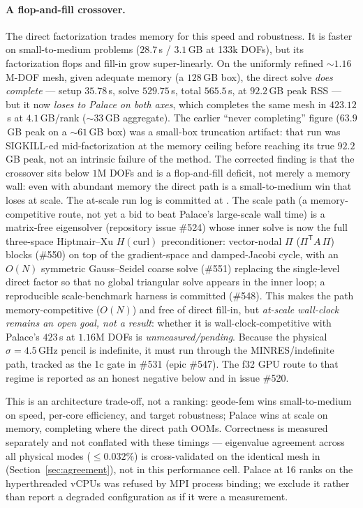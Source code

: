 \documentclass{anvil-paper}
\begin{document}
\paragraph{A flop-and-fill crossover.} The direct factorization trades
memory for this speed and robustness. It is faster on small-to-medium
problems ($28.7$\,s / $3.1$\,GB at 133k DOFs), but its factorization
flops and fill-in grow super-linearly. On the uniformly refined
${\sim}1.16$M-DOF mesh, given adequate memory (a $128$\,GB box), the
direct solve \emph{does complete} --- setup $35.78$\,s, solve
$529.75$\,s, total $565.5$\,s, at $92.2$\,GB peak RSS --- but it now
\emph{loses to Palace on both axes}, which completes the same mesh in
$423.12$\,s at $4.1$\,GB/rank (${\sim}33$\,GB aggregate). The earlier
``never completing'' figure ($63.9$\,GB peak on a ${\sim}61$\,GB box) was
a small-box truncation artifact: that run was SIGKILL-ed mid-factorization
at the memory ceiling before reaching its true $92.2$\,GB peak, not an
intrinsic failure of the method. The corrected finding is that the
crossover sits below $1$M DOFs and is a flop-and-fill deficit, not merely
a memory wall: even with abundant memory the direct path is a
small-to-medium win that loses at scale. The at-scale run log is committed
at . The scale path
(a memory-competitive route, not yet a bid to beat Palace's large-scale
wall time) is a matrix-free eigensolver (repository issue \#524) whose
inner solve is now the full three-space Hiptmair--Xu
$H(\mathrm{curl})$ preconditioner: vector-nodal $\Pi$
($\Pi^{\mathsf{T}}\!A\,\Pi$) blocks (\#550) on top of the gradient-space
and damped-Jacobi cycle, with an $O(N)$ symmetric Gauss--Seidel coarse
solve (\#551) replacing the single-level direct factor so that no global
triangular solve appears in the inner loop; a reproducible scale-benchmark
harness is committed (\#548). This makes the path memory-competitive
($O(N)$) and free of direct fill-in, but \emph{at-scale wall-clock remains
an open goal, not a result}: whether it is wall-clock-competitive with
Palace's $423$\,s at $1.16$M DOFs is \emph{unmeasured/pending}. Because the
physical $\sigma = 4.5$\,GHz pencil is indefinite, it must run through the
MINRES/indefinite path, tracked as the 1c gate in \#531 (epic \#547). The
f32 GPU route to that regime is reported as an honest negative below and in
issue \#520.

This is an architecture trade-off, not a ranking: geode-fem wins
small-to-medium on speed, per-core efficiency, and target robustness;
Palace wins at scale on memory, completing where the direct path OOMs.
Correctness is measured separately and not conflated with these timings
--- eigenvalue agreement across all physical modes ($\leq 0.032\%$) is
cross-validated on the identical mesh in
(Section~\ref{sec:agreement}), not in this performance cell. Palace at 16
ranks on the hyperthreaded vCPUs was refused by MPI process binding; we
exclude it rather than report a degraded configuration as if it were a
measurement.
\end{document}

